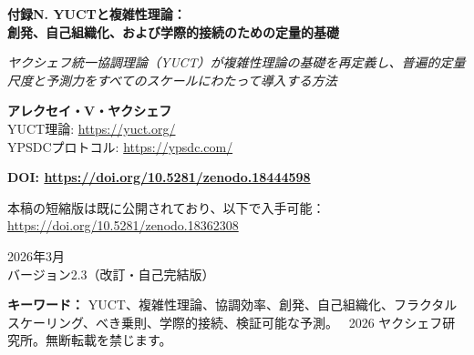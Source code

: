 \documentclass[11pt,a4paper]{article}
\theoremstyle{remark}
\newcommand{\Keff}{K_{\mathrm{eff}}}
\begin{document}
	
	\begin{titlepage} 
		\centering
		\vspace*{0cm}
		{\Huge\textbf{付録N. YUCTと複雑性理論：\\ 創発、自己組織化、および学際的接続のための定量的基礎}\par}
		\vspace{1.2cm}
		{\small\textit{ヤクシェフ統一協調理論（YUCT）が複雑性理論の基礎を再定義し、普遍的定量尺度と予測力をすべてのスケールにわたって導入する方法}}\par
		\vspace{1.2cm}
		{\small\textbf{アレクセイ・V・ヤクシェフ} \\}
		YUCT理論: \url{https://yuct.org/}\\
		YPSDCプロトコル: \url{https://ypsdc.com/}\par
		\vspace{2cm}
		\textbf{DOI: \url{https://doi.org/10.5281/zenodo.18444598}}\par
		\vspace{1cm}
		本稿の短縮版は既に公開されており、以下で入手可能：\\ \url{https://doi.org/10.5281/zenodo.18362308}\par
		\vspace{1cm}
		2026年3月 \\ バージョン2.3（改訂・自己完結版）\par
		\newpage
		\begin{abstract}
			\noindent
			本付録は、ヤクシェフ統一協調理論（YUCT）が複雑性理論を定性的概念（創発、自己組織化、べき乗則）の集合から定量的で予測的な科学へと変容させる方法について体系的な説明を提示する。主要な要素：（i）協調効率\(\Keff\)をシステム組織化の普遍的尺度とし、統一された操作的定義を与える；（ii）指数\(\beta = 0.67\)を持つ基本的誤差スケーリング則\(\varepsilon = \kappa_c \alpha \Keff^{-\beta}\)（付録Lで導出され、ここで要約される）が、領域を超えたべき乗則の起源を説明する；（iii）YPSDCプロトコルが、辞書とインデックスの分離を通じて自己組織化のメカニズムを明らかにする；（iv）120セクターと7140の結合\(\kappa_{sr}\)を持つ19次元幾何学（付録A）が、学際的モデリングのための数学的構造を提供する；（v）原子結合エネルギーから宇宙マイクロ波背景放射のゆらぎまで、50桁以上にわたる経験的検証の自己完結的な要約；（vi）化学、生物学、経済学、意識研究における具体的で検証可能な予測。本付録は、新しい性質の創発が臨界\(\Keff\)値の達成に対応し、それが理論的に予測可能であることを示す。物理的、生物学的、社会的、認知的システムにおける複雑性を記述するための統一された言語を提供し、新しい科学分野である\textbf{協調システム学}の基礎を築く。
		\end{abstract}
		\vspace{0.5cm}
		\noindent
		{\small\textbf{キーワード：}} YUCT、複雑性理論、協調効率、創発、自己組織化、フラクタルスケーリング、べき乗則、学際的接続、検証可能な予測。
		\vspace{0.2cm}
		\noindent
		\textcopyright\ 2026 ヤクシェフ研究所。無断転載を禁じます。
	\end{titlepage}
	
\end{document}
